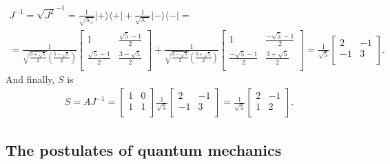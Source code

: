 \documentclass[a4paper,12pt]{article}
\newcommand{\la}{\langle}
\newcommand{\ra}{\rangle}
\begin{document}
    \begin{gather}
        \nonumber
        J^{-1} = \sqrt{J^2}^{-1} = \frac{1}{\sqrt{\lambda_+}} |+\ra\la +| + \frac{1}{\sqrt{\lambda_-}} |- \ra\la -| =\\
        =
        \frac{1}{ \sqrt{\frac{3+\sqrt{5}}{2}} \left(\frac{5 - \sqrt{5}}{2} \right) }
        \begin{bmatrix}
            1 & \frac{\sqrt{5}-1}{2}\\
            \frac{\sqrt{5}-1}{2} & \frac{3 - \sqrt{5}}{2}\\
        \end{bmatrix}
        +
        \frac{1}{ \sqrt{\frac{3-\sqrt{5}}{2}} \left(\frac{5 + \sqrt{5}}{2} \right) }
        \begin{bmatrix}
            1 & \frac{-\sqrt{5}-1}{2}\\
            \frac{-\sqrt{5}-1}{2} & \frac{3 + \sqrt{5}}{2}\\
        \end{bmatrix}
        =
        \frac{1}{\sqrt{5}}
        \begin{bmatrix}
            2 & -1\\
            -1 & 3\\
        \end{bmatrix}
        \textrm{.}
    \end{gather}
    And finally, $S$ is
    \begin{gather}
        S = A J^{-1}
        =
        \begin{bmatrix}
            1 & 0\\
            1 & 1\\
        \end{bmatrix}
        \frac{1}{\sqrt{5}}
        \begin{bmatrix}
            2 & -1\\
            -1 & 3\\
        \end{bmatrix}
        =
        \frac{1}{ \sqrt{5} }
        \begin{bmatrix}
            2 & -1\\
            1 & 2\\
        \end{bmatrix}
        \textrm{.}
    \end{gather}

    \subsection{The postulates of quantum mechanics}
\end{document}

